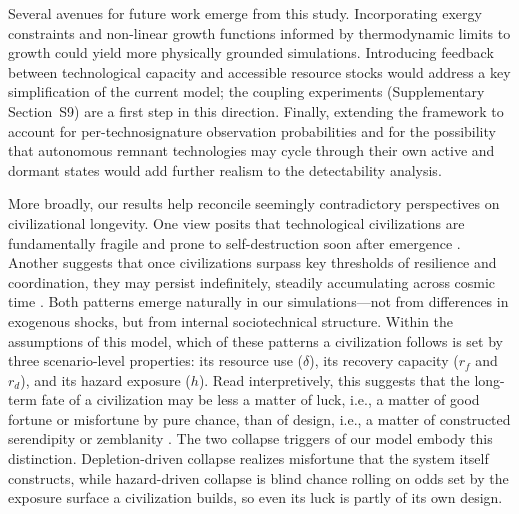 Several avenues for future work emerge from this study. Incorporating exergy constraints and non-linear growth functions informed by thermodynamic limits to growth \citep{Haqq-Misra2025-lum} could yield more physically grounded simulations. Introducing feedback between technological capacity and accessible resource stocks would address a key simplification of the current model; the coupling experiments (Supplementary Section~S9) are a first step in this direction. Finally, extending the framework to account for per-technosignature observation probabilities and for the possibility that autonomous remnant technologies may cycle through their own active and dormant states would add further realism to the detectability analysis.

More broadly, our results help reconcile seemingly contradictory perspectives on civilizational longevity. One view posits that technological civilizations are fundamentally fragile and prone to self-destruction soon after emergence \citep{Vinn2024-pi}. Another suggests that once civilizations surpass key thresholds of resilience and coordination, they may persist indefinitely, steadily accumulating across cosmic time \citep{Grinspoon2009-cg}. Both patterns emerge naturally in our simulations---not from differences in exogenous shocks, but from internal sociotechnical structure. Within the assumptions of this model, which of these patterns a civilization follows is set by three scenario-level properties: its resource use ($\delta$), its recovery capacity ($r_f$ and $r_d$), and its hazard exposure ($h$). Read interpretively, this suggests that the long-term fate of a civilization may be less a matter of luck, i.e., a matter of good fortune or misfortune by pure chance, than of design, i.e., a matter of constructed serendipity or zemblanity \citep{Giustiniano2016-oz}. The two collapse triggers of our model embody this distinction. Depletion-driven collapse realizes misfortune that the system itself constructs, while hazard-driven collapse is blind chance rolling on odds set by the exposure surface a civilization builds, so even its luck is partly of its own design.
